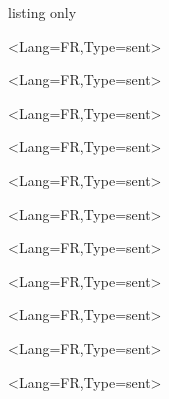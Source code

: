 \documentclass[french,11pt,a4paper]{article}
\begin{document}

\pagebreak

\begin{DemoCode}{listing only}
\begin{EnvtExo}\ipsum<Lang=FR,Type=sent>\end{EnvtExo}%

\begin{EnvtExo}[Trait=pointilles]\ipsum<Lang=FR,Type=sent>\end{EnvtExo}%

\begin{EnvtExo}[Trait=dashilles]\ipsum<Lang=FR,Type=sent>\end{EnvtExo}%

\begin{EnvtExo}[Decoration=Icone/\faPython]\ipsum<Lang=FR,Type=sent>\end{EnvtExo}%

\begin{EnvtExo}[Decoration=Ceinture/rouge]\ipsum<Lang=FR,Type=sent>\end{EnvtExo}%

\begin{EnvtExo}[Decoration=Chrono/20]\ipsum<Lang=FR,Type=sent>\end{EnvtExo}%

\begin{EnvtExo}[Decoration=Image/goku_ssj4]\ipsum<Lang=FR,Type=sent>\end{EnvtExo}%

\begin{EnvtExo}[Decoration=faEtoiles/1.5§4]\ipsum<Lang=FR,Type=sent>\end{EnvtExo}%

\begin{EnvtExo}[Decoration=tkzEtoiles/3.5§5]\ipsum<Lang=FR,Type=sent>\end{EnvtExo}%

\begin{EnvtExo}[Decoration=Points/7.5]\ipsum<Lang=FR,Type=sent>\end{EnvtExo}%

\begin{EnvtExo}[Decoration=Speedo/4.25§6]\ipsum<Lang=FR,Type=sent>\end{EnvtExo}%


\end{DemoCode}
\end{document}
